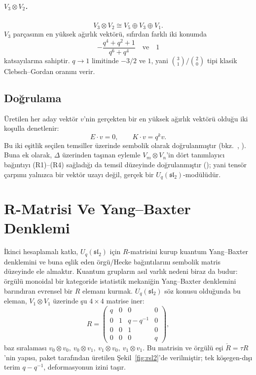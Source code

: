 \documentclass[12pt,a4paper,fleqn]{report}
\newcommand{\normalsemi}{;}
\newcommand{\normalsemi}{\begingroup\semicolonfont;\endgroup}
\numberwithin{equation}{chapter}
\theoremstyle{plain}
\theoremstyle{definition}
\renewcommand{\sl}{\mathfrak{sl}}
\newcommand{\Uq}{U_q(\sl_2)}
\newcommand{\cop}{\Delta}
\newcommand{\Rcheck}{\check{R}}
\begin{document}
\paragraph{$V_3 \otimes V_2$.}
\[
  V_3 \otimes V_2 \cong V_5 \oplus V_3 \oplus V_1.
\]
$V_3$ parçasının en yüksek ağırlık vektörü, sıfırdan farklı iki konumda
\[
  -\frac{q^4 + q^2 + 1}{q^6 + q^4} \quad\text{ve}\quad 1
\]
katsayılarına sahiptir. $q \to 1$ limitinde $-3/2$ ve $1$, yani
$\binom{3}{1}/\binom{2}{0}$ tipi klasik Clebsch--Gordan oranını verir.

\section{Doğrulama}

Üretilen her aday vektör $v$'nin gerçekten bir en yüksek ağırlık vektörü olduğu
iki koşulla denetlenir:
\begin{equation}
  E \cdot v = 0, \qquad K \cdot v = q^k v.
\end{equation}
Bu iki eşitlik seçilen temsiller üzerinde sembolik olarak doğrulanmıştır
(bkz.\ , ).
Buna ek olarak, $\cop$ üzerinden taşınan eylemle $V_m \otimes V_n$'in dört
tanımlayıcı bağıntıyı (R1)--(R4) sağladığı da temsil düzeyinde doğrulanmıştır
()\normalsemi{} yani tensör çarpımı yalnızca bir
vektör uzayı değil, gerçek bir $\Uq$-modülüdür.

\chapter{R-Matrisi Ve Yang--Baxter Denklemi}

İkinci hesaplamalı katkı, $\Uq$ için $R$-matrisini kurup kuantum Yang--Baxter
denklemini ve buna eşlik eden örgü/Hecke bağıntılarını sembolik matris düzeyinde
ele almaktır. Kuantum grupların asıl varlık nedeni biraz da budur: örgülü
monoidal bir kategoride istatistik mekaniğin Yang--Baxter denklemini barındıran
evrensel bir $R$ elemanı kurmak. $\Uq$ söz konusu olduğunda bu eleman,
$V_1 \otimes V_1$ üzerinde şu $4 \times 4$ matrise iner:
\begin{equation}\label{eq:R}
  R = \begin{pmatrix}
    q & 0 & 0 & 0 \\
    0 & 1 & q - q^{-1} & 0 \\
    0 & 0 & 1 & 0 \\
    0 & 0 & 0 & q
  \end{pmatrix},
\end{equation}
baz sıralaması $v_0\!\otimes\! v_0,\ v_0\!\otimes\! v_1,\ v_1\!\otimes\! v_0,\ v_1\!\otimes\! v_1$.
Bu matrisin ve örgülü eşi $\Rcheck=\tau R$'nin yapısı, paket tarafından üretilen
Şekil~\ref{fig:rsl2}'de verilmiştir\normalsemi{} tek köşegen-dışı terim $q-q^{-1}$,
deformasyonun izini taşır.
\end{document}
